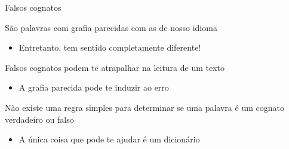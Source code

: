\documentclass[compress,mathserif]{beamer}
\begin{document}

\begin{frame}{Falsos cognatos}

São palavras com grafia parecidas com as de nosso idioma
\begin{itemize}
    \item Entretanto, tem sentido completamente diferente!
\end{itemize}

\vspace{0.5cm}

Falsos cognatos podem te atrapalhar na leitura de um texto
\begin{itemize}
    \item A grafia parecida pode te induzir ao erro
\end{itemize}

\vspace{0.5cm}

Não existe uma regra simples para determinar se uma palavra é um cognato verdadeiro ou falso
\begin{itemize}
    \item A única coisa que pode te ajudar é um dicionário
\end{itemize}
\end{frame}

\end{document}
